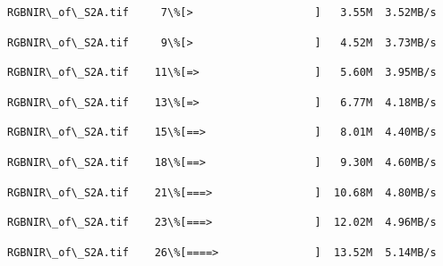 \documentclass[11pt]{article}
\begin{document}
    \begin{Verbatim}[commandchars=\\\{\}]
 RGBNIR\_of\_S2A.tif     7\%[>                   ]   3.55M  3.52MB/s
    \end{Verbatim}

    \begin{Verbatim}[commandchars=\\\{\}]
 RGBNIR\_of\_S2A.tif     9\%[>                   ]   4.52M  3.73MB/s
    \end{Verbatim}

    \begin{Verbatim}[commandchars=\\\{\}]
 RGBNIR\_of\_S2A.tif    11\%[=>                  ]   5.60M  3.95MB/s
    \end{Verbatim}

    \begin{Verbatim}[commandchars=\\\{\}]
 RGBNIR\_of\_S2A.tif    13\%[=>                  ]   6.77M  4.18MB/s
    \end{Verbatim}

    \begin{Verbatim}[commandchars=\\\{\}]
 RGBNIR\_of\_S2A.tif    15\%[==>                 ]   8.01M  4.40MB/s
    \end{Verbatim}

    \begin{Verbatim}[commandchars=\\\{\}]
 RGBNIR\_of\_S2A.tif    18\%[==>                 ]   9.30M  4.60MB/s
    \end{Verbatim}

    \begin{Verbatim}[commandchars=\\\{\}]
 RGBNIR\_of\_S2A.tif    21\%[===>                ]  10.68M  4.80MB/s
    \end{Verbatim}

    \begin{Verbatim}[commandchars=\\\{\}]
 RGBNIR\_of\_S2A.tif    23\%[===>                ]  12.02M  4.96MB/s
    \end{Verbatim}

    \begin{Verbatim}[commandchars=\\\{\}]
 RGBNIR\_of\_S2A.tif    26\%[====>               ]  13.52M  5.14MB/s
    \end{Verbatim}
\end{document}
